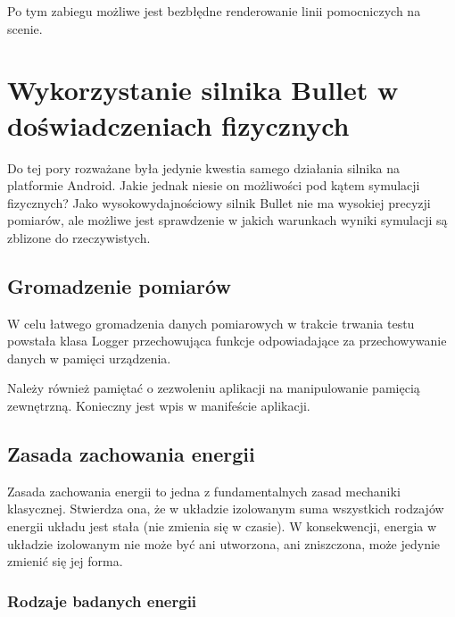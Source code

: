 Po tym zabiegu możliwe jest bezbłędne renderowanie linii pomocniczych na scenie.


\newpage
\section{Wykorzystanie silnika Bullet w doświadczeniach fizycznych}
Do tej pory rozważane była jedynie kwestia samego działania silnika na
platformie Android. Jakie jednak niesie on możliwości pod kątem symulacji
fizycznych? Jako wysokowydajnościowy silnik Bullet nie ma wysokiej precyzji
pomiarów, ale możliwe jest sprawdzenie w jakich warunkach wyniki symulacji są
zblizone do rzeczywistych.

\subsection{Gromadzenie pomiarów}
W celu łatwego gromadzenia danych pomiarowych w trakcie trwania testu powstała
klasa Logger przechowująca funkcje odpowiadające za przechowywanie danych w
pamięci urządzenia.
  
Należy również pamiętać o zezwoleniu aplikacji na manipulowanie pamięcią
zewnętrzną. Konieczny jest wpis w manifeście aplikacji.


\subsection{Zasada zachowania energii}
Zasada zachowania energii to jedna z fundamentalnych zasad mechaniki klasycznej.
Stwierdza ona, że w układzie izolowanym suma wszystkich rodzajów energii układu
jest stała (nie zmienia się w czasie). W konsekwencji, energia w układzie
izolowanym nie może być ani utworzona, ani zniszczona, może jedynie zmienić się
jej forma.\\

\subsubsection{Rodzaje badanych energii}

